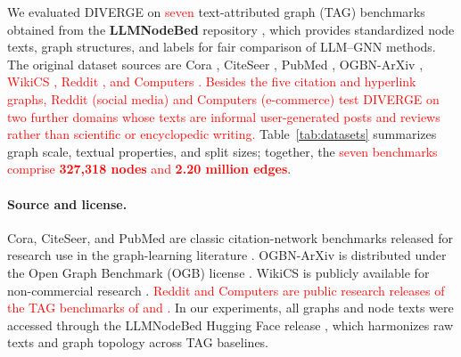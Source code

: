 \documentclass[a4paper,fleqn]{cas-sc}
\newcommand{\revone}[1]{\textcolor{red}{#1}}   %
\begin{document}
We evaluated DIVERGE on \revone{seven} text-attributed graph (TAG) benchmarks obtained from the \textbf{LLMNodeBed} repository \citep{Wu2025,Wu2025LLMNode}, which provides standardized node texts, graph structures, and labels for fair comparison of LLM--GNN methods. The original dataset sources are Cora \citep{cora}, CiteSeer \citep{giles1998citeseer}, PubMed \citep{pubmed}, OGBN-ArXiv \citep{hu2020ogb}, \revone{WikiCS \citep{mernyei2020wikics}, Reddit \citep{Huang2024GNNAdapters}, and Computers \citep{yan2023cstag}. Besides the five citation and hyperlink graphs, Reddit (social media) and Computers (e-commerce) test DIVERGE on two further domains whose texts are informal user-generated posts and reviews rather than scientific or encyclopedic writing.} Table~\ref{tab:datasets} summarizes graph scale, textual properties, and split sizes; together, the \revone{seven benchmarks comprise \textbf{327,318 nodes} and \textbf{2.20 million edges}}.

\paragraph{Source and license.}
Cora, CiteSeer, and PubMed are classic citation-network benchmarks released for research use in the graph-learning literature \citep{cora,giles1998citeseer,pubmed}. OGBN-ArXiv is distributed under the Open Graph Benchmark (OGB) license \citep{hu2020ogb}. WikiCS is publicly available for non-commercial research \citep{mernyei2020wikics}. \revone{Reddit and Computers are public research releases of the TAG benchmarks of \citet{Huang2024GNNAdapters} and \citet{yan2023cstag}.} In our experiments, all graphs and node texts were accessed through the LLMNodeBed Hugging Face release \citep{Wu2025}, which harmonizes raw texts and graph topology across TAG baselines.
\end{document}
